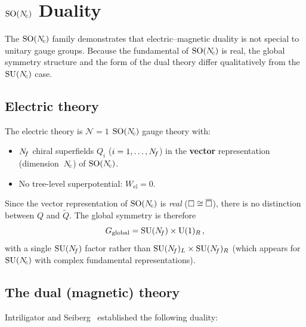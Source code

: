 \documentclass[11pt,a4paper]{article}
\newcommand{\SO}[1]{\mathrm{SO}(#1)}
\begin{document}
\section{$\SO{\Nc}$ Duality}
\label{sec:SO-duality}

The $\SO{\Nc}$ family demonstrates that electric--magnetic duality is not
special to unitary gauge groups.  Because the fundamental of $\SO{\Nc}$
is real, the global symmetry structure and the form of the dual theory
differ qualitatively from the $\mathrm{SU}(N_{\!c})$ case.

\subsection{Electric theory}

The electric theory is $\mathcal{N}=1$ $\SO{\Nc}$ gauge theory with:
\begin{itemize}
  \item $N_{\!f}$ chiral superfields $Q_i$ ($i = 1, \ldots, N_{\!f}$) in the
    \textbf{vector} representation (dimension~$N_{\!c}$) of $\SO{\Nc}$.
  \item No tree-level superpotential: $W_{\text{el}} = 0$.
\end{itemize}

Since the vector representation of $\SO{\Nc}$ is \emph{real}
($\square \cong \overline{\square}$), there is no distinction between
$Q$ and $\widetilde{Q}$.  The global symmetry is therefore
\[
  G_{\text{global}} = \mathrm{SU}(N_{\!f}) \times \mathrm{U}(1)_R\,,
\]
with a single $\mathrm{SU}(N_{\!f})$ factor rather than
$\mathrm{SU}(N_{\!f})_L \times \mathrm{SU}(N_{\!f})_R$ (which appears for $\mathrm{SU}(N_{\!c})$
with complex fundamental representations).

\subsection{The dual (magnetic) theory}

Intriligator and Seiberg~\cite{IS9503179} established the following
duality:
\end{document}

